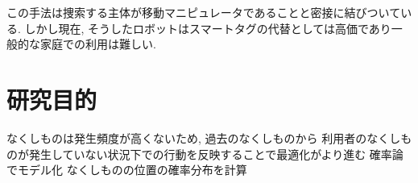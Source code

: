 この手法は捜索する主体が移動マニピュレータであることと密接に結びついている. 
しかし現在, そうしたロボットはスマートタグの代替としては高価であり一般的な家庭での利用は難しい. 


\section{研究目的}
なくしものは発生頻度が高くないため, 過去のなくしものから
利用者のなくしものが発生していない状況下での行動を反映することで最適化がより進む
確率論でモデル化
なくしものの位置の確率分布を計算
